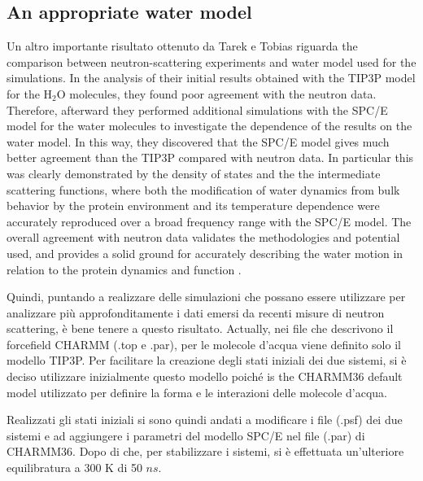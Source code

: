 \subsection{An appropriate water model}
Un altro importante risultato ottenuto da Tarek e Tobias riguarda the comparison between neutron-scattering experiments and water model used for the simulations.
In the analysis of their initial results obtained with the TIP3P model \cite{jorgensen1983comparison} for the H$_2$O molecules, they found poor agreement with the neutron data. Therefore, afterward they performed additional simulations with the SPC/E \cite{berendsen1987missing} model for the water molecules to investigate the dependence of the results on the water model. In this way, they discovered that the SPC/E model gives much better agreement than the TIP3P compared with neutron data.  
In particular this was clearly demonstrated by the density of states and the  the intermediate scattering functions, where both the modification of water dynamics from bulk behavior by the protein environment and its temperature dependence were accurately reproduced over a broad frequency range with the SPC/E model. The overall agreement with neutron data validates the methodologies and potential used, and provides a solid ground for accurately describing the water motion in relation to the protein dynamics and function  \cite{tarek2000dynamics}.

Quindi, puntando a realizzare delle simulazioni che possano essere utilizzare per analizzare più approfonditamente i dati emersi da recenti misure di neutron scattering, è bene tenere a questo risultato. Actually, nei file che descrivono il forcefield CHARMM (.top e .par), per le molecole d'acqua viene definito solo il modello TIP3P. Per facilitare la creazione degli stati iniziali dei due sistemi, si è deciso utilizzare inizialmente questo modello poiché is the CHARMM36 default model utilizzato per definire la forma e le interazioni delle molecole d'acqua. 

Realizzati gli stati iniziali si sono quindi andati a modificare i file (.psf) dei due sistemi e ad aggiungere i parametri del modello SPC/E nel file (.par) di CHARMM36. Dopo di che, per stabilizzare i sistemi, si è effettuata un'ulteriore equilibratura a 300 K di 50 $ns$.

